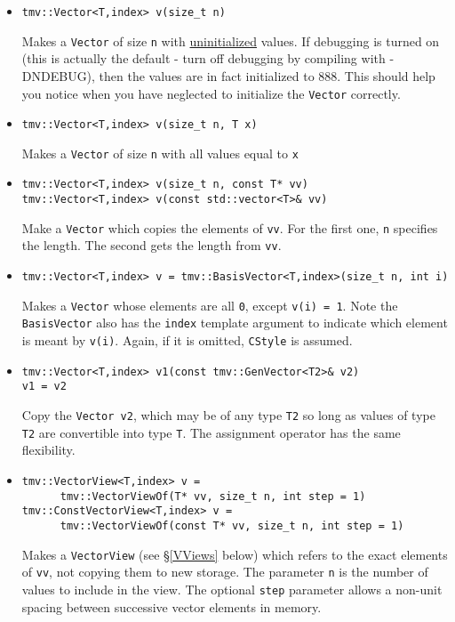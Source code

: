 \documentclass[twoside,letterpaper,11pt]{article}
\renewcommand{\tt}[1]{{\texttt {#1}}}
\begin{document}
\begin{itemize}
\item 
\begin{verbatim}
tmv::Vector<T,index> v(size_t n)
\end{verbatim}
Makes a \tt{Vector} of size \tt{n} with \underline{uninitialized} values.
If debugging is turned on (this is actually the default - 
turn off debugging by compiling
with -DNDEBUG), then the values are in fact initialized to 888.  
This should help you notice
when you have neglected to initialize the \tt{Vector} correctly.

\item
\begin{verbatim}
tmv::Vector<T,index> v(size_t n, T x)
\end{verbatim}
Makes a \tt{Vector} of size \tt{n} with all values equal to \tt{x}

\item
\begin{verbatim}
tmv::Vector<T,index> v(size_t n, const T* vv)
tmv::Vector<T,index> v(const std::vector<T>& vv)
\end{verbatim}
Make a \tt{Vector} which copies the elements of \tt{vv}.
For the first one, \tt{n} specifies the length.  The second gets
the length from \tt{vv}.

\item
\begin{verbatim}
tmv::Vector<T,index> v = tmv::BasisVector<T,index>(size_t n, int i)
\end{verbatim}
Makes a \tt{Vector} whose elements are all \tt{0}, except \tt{v(i) = 1}.
Note the \tt{BasisVector} also has the \tt{index} template argument to 
indicate which element is meant by \tt{v(i)}.  Again, if it is omitted,
\tt{CStyle} is assumed.

\item
\begin{verbatim}
tmv::Vector<T,index> v1(const tmv::GenVector<T2>& v2)
v1 = v2
\end{verbatim}
Copy the \tt{Vector v2}, which may be of any type \tt{T2} so long
as values of type \tt{T2} are convertible into type \tt{T}.
The assignment operator has the same flexibility.

\item
\begin{verbatim}
tmv::VectorView<T,index> v = 
      tmv::VectorViewOf(T* vv, size_t n, int step = 1)
tmv::ConstVectorView<T,index> v = 
      tmv::VectorViewOf(const T* vv, size_t n, int step = 1)
\end{verbatim}
Makes a \tt{VectorView} (see \S\ref{VViews} below) which refers to the exact
elements of \tt{vv}, not copying them to new storage.  The parameter \tt{n}
is the number of values to include in the view.
The optional \tt{step} parameter allows a non-unit spacing between 
successive vector elements in memory. 

\end{itemize}
\end{document}
